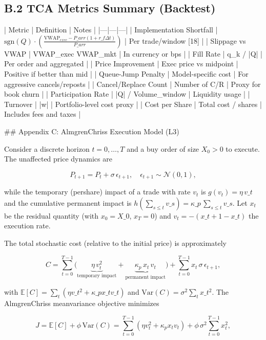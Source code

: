 \documentclass[11pt]{article}
\begin{document}
\subsection{B.2 TCA Metrics Summary (Backtest)}

| Metric | Definition | Notes |
|---|---|---|
| Implementation Shortfall | $\text{sgn}(Q) \cdot \left(\frac{\text{VWAP}_{exec} - P\_{arr}(1+r\_f \Delta t)}{P\_{arr}}\right)$ | Per trade/window [18] |
| Slippage vs VWAP | VWAP_exec  VWAP_mkt | In currency or bps |
| Fill Rate |  q_k / |Q| | Per order and aggregated |
| Price Improvement | Exec price vs midpoint | Positive if better than mid |
| Queue-Jump Penalty | Model-specific cost | For aggressive cancels/reposts |
| Cancel/Replace Count | Number of C/R | Proxy for book churn |
| Participation Rate | |Q| / Volume_window | Liquidity usage |
| Turnover |  |w| | Portfolio-level cost proxy |
| Cost per Share | Total cost / shares | Includes fees and taxes |
 
\#\# Appendix C: AlmgrenChriss Execution Model (L3)

Consider a discrete horizon $t=0,\ldots,T$ and a buy order of size $X_0>0$ to execute. The unaffected price dynamics are

\begin{equation}
P_{t+1} = P_t + \sigma\,\epsilon_{t+1},\quad \epsilon_{t+1}\sim\mathcal{N}(0,1),
\end{equation}

while the temporary (pershare) impact of a trade with rate $v_t$ is $g(v_t)=\eta\,v\_t$ and the cumulative permanent impact is $h(\sum_{s\le t} v\_s)=\kappa\_p\,\sum_{s\le t} v\_s$. Let $x_t$ be the residual quantity (with $x_0=X\_0$, $x_T=0$) and $v_t=-(x\_{t+1}-x\_t)$ the execution rate.

The total stochastic cost (relative to the initial price) is approximately

\begin{equation}
C = \sum_{t=0}^{T-1} \big( \underbrace{\eta\,v_t^2}_{\text{temporary impact}} + \underbrace{\kappa_p\,x_t\,v_t}_{\text{permanent impact}} \big) + \sum_{t=0}^{T-1} x_t\,\sigma\,\epsilon_{t+1},
\end{equation}

with $\mathbb{E}[C] = \sum_t (\eta v\_t^2 + \kappa\_p x\_t v\_t)$ and $\mathrm{Var}(C)=\sigma^2\sum_t x\_t^2$. The AlmgrenChriss meanvariance objective minimizes

\begin{equation}
J = \mathbb{E}[C] + \phi\,\mathrm{Var}(C) = \sum_{t=0}^{T-1} (\eta v_t^2 + \kappa_p x_t v_t) + \phi\,\sigma^2\sum_{t=0}^{T-1} x_t^2,
\end{equation}
\end{document}
